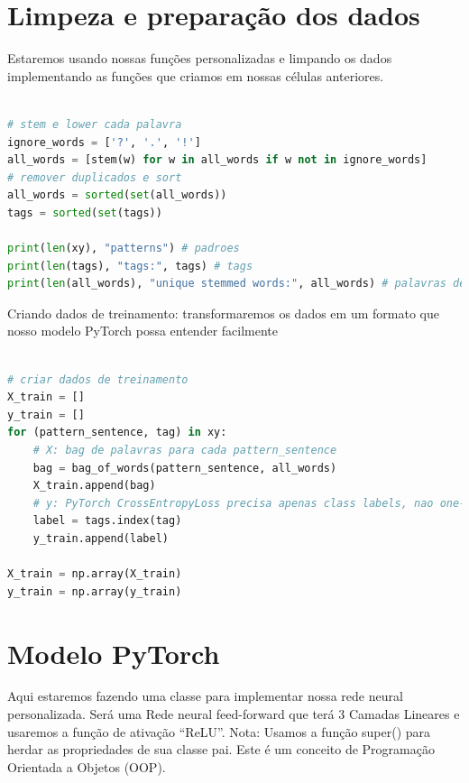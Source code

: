 \section[Limpeza e preparação dos dados]{Limpeza e preparação dos dados}


Estaremos usando nossas funções personalizadas e limpando os dados implementando as funções que criamos em nossas células anteriores.

\begin{lstlisting}[language=Python, caption=Data Cleaning]

# stem e lower cada palavra
ignore_words = ['?', '.', '!']
all_words = [stem(w) for w in all_words if w not in ignore_words]
# remover duplicados e sort
all_words = sorted(set(all_words))
tags = sorted(set(tags))

print(len(xy), "patterns") # padroes
print(len(tags), "tags:", tags) # tags
print(len(all_words), "unique stemmed words:", all_words) # palavras derivadas unicas

\end{lstlisting}

Criando dados de treinamento: transformaremos os dados em um formato que nosso modelo PyTorch possa entender facilmente

\begin{lstlisting}[language=Python, caption=Training Data]

# criar dados de treinamento
X_train = []
y_train = []
for (pattern_sentence, tag) in xy:
    # X: bag de palavras para cada pattern_sentence
    bag = bag_of_words(pattern_sentence, all_words)
    X_train.append(bag)
    # y: PyTorch CrossEntropyLoss precisa apenas class labels, nao one-hot
    label = tags.index(tag)
    y_train.append(label)

X_train = np.array(X_train)
y_train = np.array(y_train)

\end{lstlisting}

\section[Modelo PyTorch]{Modelo PyTorch}

Aqui estaremos fazendo uma classe para implementar nossa rede neural personalizada. Será uma Rede neural feed-forward que terá 3 Camadas Lineares e usaremos a função de ativação “ReLU”. Nota: Usamos a função super() para herdar as propriedades de sua classe pai. Este é um conceito de Programação Orientada a Objetos (OOP).

